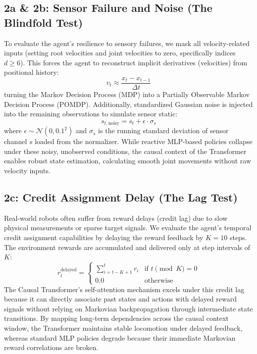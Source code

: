 \documentclass[11pt,a4paper]{article}
\begin{document}
\subsection{2a \& 2b: Sensor Failure and Noise (The Blindfold Test)}
To evaluate the agent's resilience to sensory failures, we mask all velocity-related inputs (setting root velocities and joint velocities to zero, specifically indices $d \ge 6$). This forces the agent to reconstruct implicit derivatives (velocities) from positional history:
\begin{equation}
v_t \approx \frac{x_t - x_{t-1}}{\Delta t}
\end{equation}
turning the Markov Decision Process (MDP) into a Partially Observable Markov Decision Process (POMDP). Additionally, standardized Gaussian noise is injected into the remaining observations to simulate sensor static:
\begin{equation}
s_{t, \text{noisy}} = s_t + \epsilon \cdot \sigma_{s}
\end{equation}
where $\epsilon \sim \mathcal{N}(0, 0.1^2)$ and $\sigma_s$ is the running standard deviation of sensor channel $s$ loaded from the normalizer. While reactive MLP-based policies collapse under these noisy, unobserved conditions, the causal context of the Transformer enables robust state estimation, calculating smooth joint movements without raw velocity inputs.

\subsection{2c: Credit Assignment Delay (The Lag Test)}
Real-world robots often suffer from reward delays (credit lag) due to slow physical measurements or sparse target signals. We evaluate the agent's temporal credit assignment capabilities by delaying the reward feedback by $K=10$ steps. The environment rewards are accumulated and delivered only at step intervals of $K$:
\begin{equation}
r^{\text{delayed}}_t = \begin{cases} \sum_{i=t-K+1}^{t} r_i & \text{if } t \pmod K = 0 \\ 0.0 & \text{otherwise} \end{cases}
\end{equation}
The Causal Transformer's self-attention mechanism excels under this credit lag because it can directly associate past states and actions with delayed reward signals without relying on Markovian backpropagation through intermediate state transitions. By mapping long-term dependencies across the causal context window, the Transformer maintains stable locomotion under delayed feedback, whereas standard MLP policies degrade because their immediate Markovian reward correlations are broken.
\end{document}
